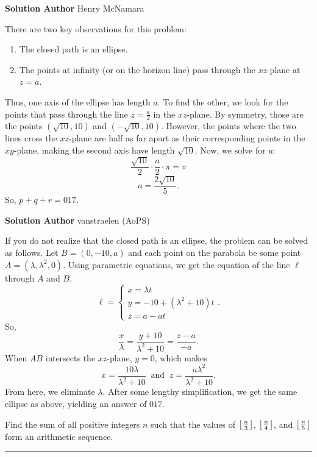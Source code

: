 \documentclass[11pt]{scrartcl}
\newcommand*{\problemfont}{\sffamily\bfseries}
\begin{document}
{\problemfont Solution Author} Henry McNamara

There are two key observations for this problem:
\begin{enumerate}
    \item The closed path is an ellipse.
    \item The points at infinity (or on the horizon line) pass through the $xz$-plane at $z = a$.
\end{enumerate}
Thus, one axis of the ellipse has length $a$. To find the other, we look for the points that pass through the line $z = \frac{a}{2}$ in the $xz$-plane. By symmetry, those are the points $(\sqrt{10},10)$ and $(-\sqrt{10},10)$. However, the points where the two lines cross the $xz$-plane are half as far apart as their corresponding points in the $xy$-plane, making the second axis have length $\sqrt{10}$. Now, we solve for $a$:
\[\frac{\sqrt{10}}{2} \cdot \frac{a}{2} \cdot \pi = \pi\]
\[a = \frac{2\sqrt{10}}{5}.\]
So, $p + q + r = \boxed{017}$.

\pagebreak

{\problemfont Solution Author} vanstraelen (AoPS)

If you do not realize that the closed path is an ellipse, the problem can be solved as follows. Let $B = (0, -10, a)$ and each point on the parabola be some point $A = (\lambda, \lambda^{2}, 0)$. Using parametric equations, we get the equation of the line $\ell$ through $A$ and $B$.
\[\ell = \begin{cases}
    x = \lambda t \\
    y = -10 + (\lambda^{2} + 10)t \\
    z = a - at
\end{cases}.\]
So,
\[\frac{x}{\lambda} = \frac{y + 10}{\lambda^{2} + 10} = \frac{z - a}{-a}.\]
When $AB$ intersects the $xz$-plane, $y = 0$, which makes
\[x = \frac{10\lambda}{\lambda^{2} + 10} \;\; \text{and} \;\; z = \frac{a\lambda^{2}}{\lambda^{2} + 10}.\]
From here, we eliminate $\lambda$. After some lengthy simplification, we get the same ellipse as above, yielding an answer of $\boxed{017}$.

\pagebreak

\begin{problem}
    Find the sum of all positive integers $n$ such that the values of $\left\lfloor \frac{n}{3} \right\rfloor$, $\left\lfloor \frac{n}{4} \right\rfloor$, and $\left\lfloor \frac{n}{5} \right\rfloor$ form an arithmetic sequence.
\end{problem}

\vspace{-\baselineskip}\rule{\textwidth}{0.4pt}
\end{document}
